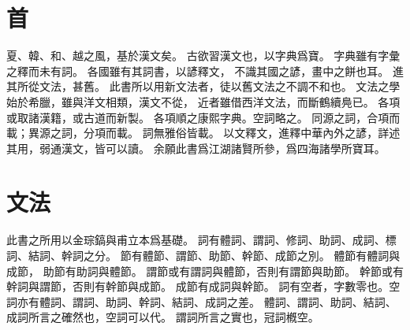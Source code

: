 \chapter*{首}
夏、韓、和、越之風，基於漢文矣。
古欲習漢文也，以字典爲寶。
字典雖有字彙之釋而未有詞。
各國雖有其詞書，以諺釋文，
不識其國之諺，畫中之餅也耳。
進其所從文法，甚舊。
此書所以用新文法者，徒以舊文法之不調不和也。
文法之學始於希臘，雖與洋文相類，漢文不從，
近者雖借西洋文法，而斷鶴續鳧已\parencite{Ahn:2012}。
各項或取諸漢籍，或古道而新製。
各項順之康熙字典。空詞略之。
同源之詞，合項而載；異源之詞，分項而載。
詞無雅俗皆載。
以文釋文，進釋中華內外之諺，詳述其用，弱通漢文，皆可以讀。
余願此書爲江湖諸賢所參，爲四海諸學所寶耳。
\chapter*{文法}
此書之所用以金琮鎬與甫立本爲基礎。
詞有體詞、謂詞、修詞、助詞、成詞、標詞、結詞、幹詞之分\parencite[43-4]{Pulleyblank:2005}\parencite[2-35]{Kim:2019}。
節有體節、謂節、助節、幹節、成節之別\parencite[15]{Kim:2019}。
體節有體詞與成節，
助節有助詞與體節。
謂節或有謂詞與體節，否則有謂節與助節。
幹節或有幹詞與謂節，否則有幹節與成節。
成節有成詞與幹節。
詞有空者，字數零也\parencite[2]{Kim:2019}。空詞亦有體詞、謂詞、助詞、幹詞、結詞、成詞之差。
體詞、謂詞、助詞、結詞、成詞所言之確然也，空詞可以代。
謂詞所言之實也，冠詞槪空。
